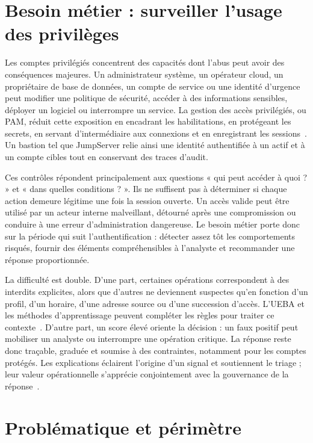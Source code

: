 \documentclass[11pt,a4paper,oneside]{report}
\theoremstyle{definition}
\theoremstyle{plain}
\begin{document}
\section{Besoin métier : surveiller l'usage des privilèges}
\label{sec:intro-motivation}

Les comptes privilégiés concentrent des capacités dont l'abus peut avoir des
conséquences majeures. Un administrateur système, un opérateur cloud, un
propriétaire de base de données, un compte de service ou une identité
d'urgence peut modifier une politique de sécurité, accéder à des informations
sensibles, déployer un logiciel ou interrompre un service. La gestion des
accès privilégiés, ou PAM, réduit cette exposition en encadrant les
habilitations, en protégeant les secrets, en servant d'intermédiaire aux
connexions et en enregistrant les sessions~\cite{ref1,ref2,ref5}. Un bastion
tel que JumpServer relie ainsi une identité authentifiée à un actif et à un
compte cibles tout en conservant des traces d'audit.

Ces contrôles répondent principalement aux questions « qui peut accéder à
quoi ? » et « dans quelles conditions ? ». Ils ne suffisent pas à déterminer
si chaque action demeure légitime une fois la session ouverte. Un accès
valide peut être utilisé par un acteur interne malveillant, détourné après une
compromission ou conduire à une erreur d'administration dangereuse. Le besoin
métier porte donc sur la période qui suit l'authentification : détecter assez
tôt les comportements risqués, fournir des éléments compréhensibles à
l'analyste et recommander une réponse proportionnée.

La difficulté est double. D'une part, certaines opérations correspondent à
des interdits explicites, alors que d'autres ne deviennent suspectes qu'en
fonction d'un profil, d'un horaire, d'une adresse source ou d'une succession
d'accès. L'UEBA et les méthodes d'apprentissage peuvent compléter les règles
pour traiter ce contexte~\cite{ref7,ref24,ref27}. D'autre part, un score élevé
oriente la décision : un faux positif peut mobiliser un
analyste ou interrompre une opération critique. La réponse reste donc
traçable, graduée et soumise à des contraintes, notamment pour les comptes
protégés. Les explications éclairent l'origine d'un signal et soutiennent le
triage ; leur valeur opérationnelle s'apprécie conjointement avec la
gouvernance de la réponse~\cite{ref12,ref13,ref25}.

\section{Problématique et périmètre}
\label{sec:intro-problem}
\end{document}
